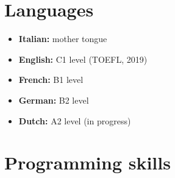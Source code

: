\documentclass[10pt, a4paper, roman]{moderncv}        %
\begin{document}
	\section{Languages}
	
	\vspace{1pt}
	
	\begin{itemize}
		
		\item \textbf{Italian:} mother tongue
		
		\vspace{1pt}
		
		\item \textbf{English:} C1 level (TOEFL, 2019)
		
		\vspace{1pt}
		
		\item \textbf{French:} B1 level
		
		\vspace{1pt}
		
		\item \textbf{German:} B2 level
		
		\vspace{1pt}
		
		\item \textbf{Dutch:} A2 level (in progress)
		
	\end{itemize}
	
	\vspace{2pt}
	
	\section{Programming skills}
	
	\vspace{1pt}
	
\end{document}
